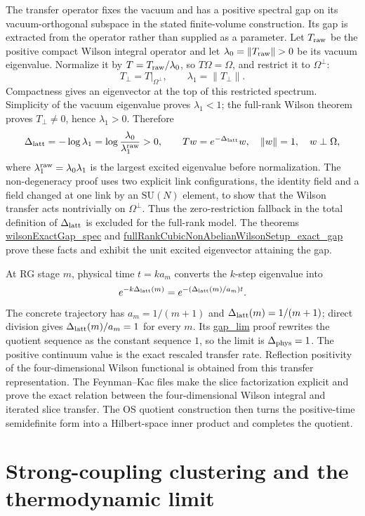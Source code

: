 \documentclass[11pt]{article}
\numberwithin{equation}{section}
\newcommand{\SU}{\mathrm{SU}}
\newcommand{\Lean}[1]{\url{#1}}
\begin{document}
The transfer operator fixes the vacuum and has a positive spectral gap on its vacuum-orthogonal subspace in the stated finite-volume construction. Its gap is extracted from the operator rather than supplied as a parameter. Let \(T_{\rm raw}\) be the positive compact Wilson integral operator and let \(\lambda_0=\|T_{\rm raw}\|>0\) be its vacuum eigenvalue. Normalize it by \(T=T_{\rm raw}/\lambda_0\), so \(T\Omega=\Omega\), and restrict it to \(\Omega^\perp\):
\[
  T_\perp=T|_{\Omega^\perp},\qquad
  \lambda_1=\|T_\perp\|.
\]
Compactness gives an eigenvector at the top of this restricted spectrum. Simplicity of the vacuum eigenvalue proves \(\lambda_1<1\); the full-rank Wilson theorem proves \(T_\perp\ne0\), hence \(\lambda_1>0\). Therefore
\[
  \Delta_{\rm latt}=-\log\lambda_1
  =\log\frac{\lambda_0}{\lambda_1^{\rm raw}}>0,\qquad
  T w=e^{-\Delta_{\rm latt}}w,\quad
  \|w\|=1,\quad w\perp\Omega,
\]
where \(\lambda_1^{\rm raw}=\lambda_0\lambda_1\) is the largest excited eigenvalue before normalization. The non-degeneracy proof uses two explicit link configurations, the identity field and a field changed at one link by an \(\SU(N)\) element, to show that the Wilson transfer acts nontrivially on \(\Omega^\perp\). Thus the zero-restriction fallback in the total definition of \(\Delta_{\rm latt}\) is excluded for the full-rank model. The theorems \Lean{wilsonExactGap_spec} and \Lean{fullRankCubicNonAbelianWilsonSetup_exact_gap} prove these facts and exhibit the unit excited eigenvector attaining the gap.

At RG stage \(m\), physical time \(t=k a_m\) converts the \(k\)-step eigenvalue into
\[
  e^{-k\Delta_{\rm latt}(m)}
  =e^{-(\Delta_{\rm latt}(m)/a_m)t}.
\]
The concrete trajectory has \(a_m=1/(m+1)\) and \(\Delta_{\rm latt}(m)=1/(m+1)\); direct division gives \(\Delta_{\rm latt}(m)/a_m=1\) for every \(m\). Its \Lean{gap_lim} proof rewrites the quotient sequence as the constant sequence \(1\), so the limit is \(\Delta_{\rm phys}=1\). The positive continuum value is the exact rescaled transfer rate. Reflection positivity of the four-dimensional Wilson functional is obtained from this transfer representation. The Feynman--Kac files make the slice factorization explicit and prove the exact relation between the four-dimensional Wilson integral and iterated slice transfer. The OS quotient construction then turns the positive-time semidefinite form into a Hilbert-space inner product and completes the quotient.

\section{Strong-coupling clustering and the thermodynamic limit}
\end{document}
